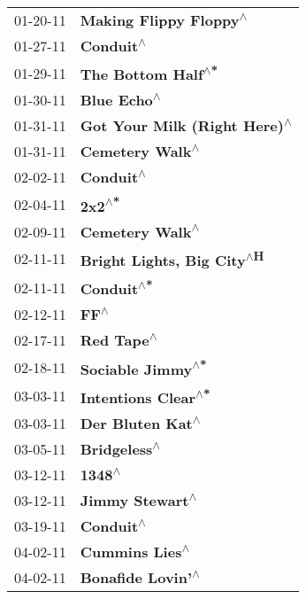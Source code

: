 \begin{supertabular}{p{0.25\columnwidth}p{0.75\columnwidth}}
 01-20-11 &        \textbf{Making Flippy Floppy\textsuperscript{$\wedge$}} \\
 01-27-11 &                     \textbf{Conduit\textsuperscript{$\wedge$}} \\
 01-29-11 &            \textbf{The Bottom Half\textsuperscript{$\wedge$*}} \\
 01-30-11 &                   \textbf{Blue Echo\textsuperscript{$\wedge$}} \\
 01-31-11 &  \textbf{Got Your Milk (Right Here)\textsuperscript{$\wedge$}} \\
 01-31-11 &               \textbf{Cemetery Walk\textsuperscript{$\wedge$}} \\
 02-02-11 &                     \textbf{Conduit\textsuperscript{$\wedge$}} \\
 02-04-11 &                        \textbf{2x2\textsuperscript{$\wedge$*}} \\
 02-09-11 &               \textbf{Cemetery Walk\textsuperscript{$\wedge$}} \\
 02-11-11 &    \textbf{Bright Lights, Big City\textsuperscript{$\wedge$H}} \\
 02-11-11 &                    \textbf{Conduit\textsuperscript{$\wedge$*}} \\
 02-12-11 &                          \textbf{FF\textsuperscript{$\wedge$}} \\
 02-17-11 &                    \textbf{Red Tape\textsuperscript{$\wedge$}} \\
 02-18-11 &             \textbf{Sociable Jimmy\textsuperscript{$\wedge$*}} \\
 03-03-11 &           \textbf{Intentions Clear\textsuperscript{$\wedge$*}} \\
 03-03-11 &              \textbf{Der Bluten Kat\textsuperscript{$\wedge$}} \\
 03-05-11 &                  \textbf{Bridgeless\textsuperscript{$\wedge$}} \\
 03-12-11 &                        \textbf{1348\textsuperscript{$\wedge$}} \\
 03-12-11 &               \textbf{Jimmy Stewart\textsuperscript{$\wedge$}} \\
 03-19-11 &                     \textbf{Conduit\textsuperscript{$\wedge$}} \\
 04-02-11 &                \textbf{Cummins Lies\textsuperscript{$\wedge$}} \\
 04-02-11 &             \textbf{Bonafide Lovin'\textsuperscript{$\wedge$}} \\

\end{supertabular}

